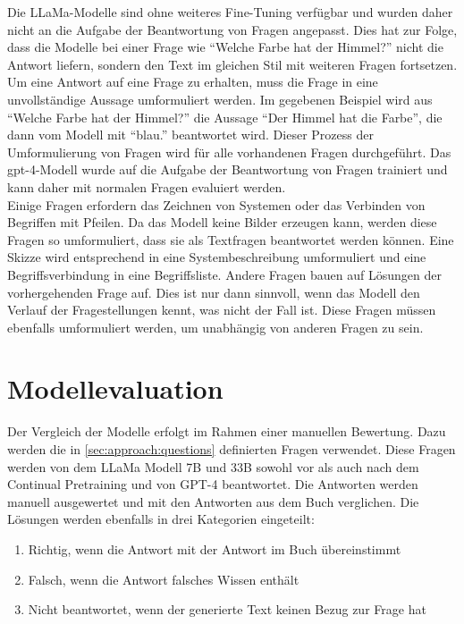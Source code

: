 Die LLaMa-Modelle sind ohne weiteres Fine-Tuning verfügbar und wurden daher nicht an die Aufgabe der Beantwortung von Fragen angepasst.
Dies hat zur Folge, dass die Modelle bei einer Frage wie \enquote{Welche Farbe hat der Himmel?} nicht die Antwort liefern, sondern den Text im gleichen Stil mit weiteren Fragen fortsetzen.
Um eine Antwort auf eine Frage zu erhalten, muss die Frage in eine unvollständige Aussage umformuliert werden.
Im gegebenen Beispiel wird aus \enquote{Welche Farbe hat der Himmel?} die Aussage \enquote{Der Himmel hat die Farbe}, die dann vom Modell mit \enquote{blau.} beantwortet wird.
Dieser Prozess der Umformulierung von Fragen wird für alle vorhandenen Fragen durchgeführt.
Das \ac{gpt}-4-Modell wurde auf die Aufgabe der Beantwortung von Fragen trainiert und kann daher mit normalen Fragen evaluiert werden.\\

Einige Fragen erfordern das Zeichnen von Systemen oder das Verbinden von Begriffen mit Pfeilen.
Da das Modell keine Bilder erzeugen kann, werden diese Fragen so umformuliert, dass sie als Textfragen beantwortet werden können.
Eine Skizze wird entsprechend in eine Systembeschreibung umformuliert und eine Begriffsverbindung in eine Begriffsliste.
Andere Fragen bauen auf Lösungen der vorhergehenden Frage auf.
Dies ist nur dann sinnvoll, wenn das Modell den Verlauf der Fragestellungen kennt, was nicht der Fall ist.
Diese Fragen müssen ebenfalls umformuliert werden, um unabhängig von anderen Fragen zu sein.

\section{Modellevaluation}\label{sec:approach:comparison}
Der Vergleich der Modelle erfolgt im Rahmen einer manuellen Bewertung.
Dazu werden die in \cref{sec:approach:questions} definierten Fragen verwendet.
Diese Fragen werden von dem LLaMa Modell 7B und 33B sowohl vor als auch nach dem Continual Pretraining und von GPT-4 beantwortet.
Die Antworten werden manuell ausgewertet und mit den Antworten aus dem Buch \citet{bb} verglichen.
Die Lösungen werden ebenfalls in drei Kategorien eingeteilt:
\begin{enumerate}
    \item Richtig, wenn die Antwort mit der Antwort im Buch übereinstimmt
    \item Falsch, wenn die Antwort falsches Wissen enthält
    \item Nicht beantwortet, wenn der generierte Text keinen Bezug zur Frage hat
\end{enumerate}

